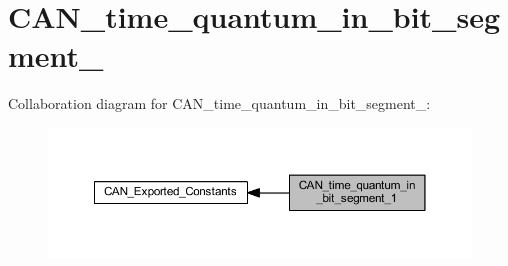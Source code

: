 \hypertarget{group___c_a_n__time__quantum__in__bit__segment__1}{}\section{C\+A\+N\+\_\+time\+\_\+quantum\+\_\+in\+\_\+bit\+\_\+segment\+\_}
\label{group___c_a_n__time__quantum__in__bit__segment__1}
Collaboration diagram for C\+A\+N\+\_\+time\+\_\+quantum\+\_\+in\+\_\+bit\+\_\+segment\+\_\+:
\nopagebreak
\begin{figure}[H]
\begin{center}
\leavevmode
\includegraphics[width=350pt]{group___c_a_n__time__quantum__in__bit__segment__1}
\end{center}
\end{figure}
